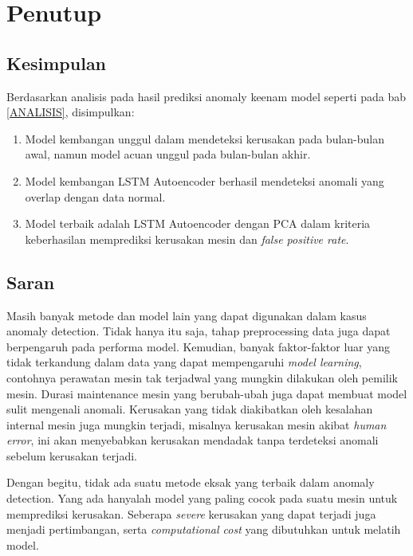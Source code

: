 \chapter{Penutup}

\section{Kesimpulan}
Berdasarkan analisis pada hasil prediksi anomaly keenam model seperti pada bab \ref{ANALISIS}, disimpulkan:
\begin{enumerate}
    \item Model kembangan unggul dalam mendeteksi kerusakan pada bulan-bulan awal, namun model acuan unggul pada bulan-bulan akhir.
    \item Model kembangan LSTM Autoencoder berhasil mendeteksi anomali yang overlap dengan data normal.
    \item Model terbaik adalah LSTM Autoencoder dengan PCA dalam kriteria keberhasilan memprediksi kerusakan mesin dan \emph{false positive rate}.
\end{enumerate}

\section{Saran}

Masih banyak metode dan model lain yang dapat digunakan dalam kasus anomaly detection. Tidak hanya itu saja, tahap preprocessing data juga dapat berpengaruh pada performa model. Kemudian, banyak faktor-faktor luar yang tidak terkandung dalam data yang dapat mempengaruhi \emph{model learning}, contohnya perawatan mesin tak terjadwal yang mungkin dilakukan oleh pemilik mesin. Durasi maintenance mesin yang berubah-ubah juga dapat membuat model sulit mengenali anomali. Kerusakan yang tidak diakibatkan oleh kesalahan internal mesin juga mungkin terjadi, misalnya kerusakan mesin akibat \emph{human error}, ini akan menyebabkan kerusakan mendadak tanpa terdeteksi anomali sebelum kerusakan terjadi.

Dengan begitu, tidak ada suatu metode eksak yang terbaik dalam anomaly detection. Yang ada hanyalah model yang paling cocok pada suatu mesin untuk memprediksi kerusakan. Seberapa \emph{severe} kerusakan yang dapat terjadi juga menjadi pertimbangan, serta \emph{computational cost} yang dibutuhkan untuk melatih model.